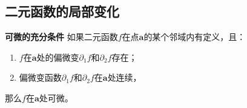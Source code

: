 \documentclass[12pt,UTF8,fontset=none]{ctexbook}
\begin{document}
\begin{appendix}

\section{二元函数的局部变化}
\begin{tm}{\textbf{可微的充分条件}}\label{tm:a-1-0}
如果二元函数$f$在点$\mathbf{a}$的某个邻域内有定义，且：
\begin{enumerate}[label=\arabic*.]
\item $f$在$\mathbf{a}$处的偏微变$\partial_1 f$和$\partial_2 f$存在；
\item 偏微变函数$\partial_1 f$和$\partial_2 f$在$\mathbf{a}$处连续，
\end{enumerate}
那么$f$在$\mathbf{a}$处可微。
\end{tm}


\end{appendix}
\end{document}
